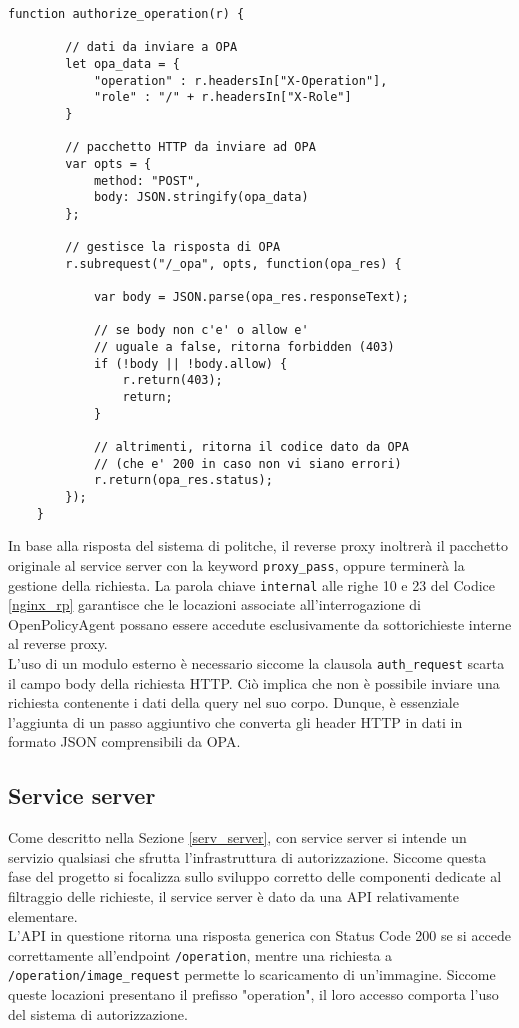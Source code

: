 \begin{lstlisting}[caption={Frammento di codice del modulo NJS},captionpos=b,label=NJS]
    function authorize_operation(r) {

        // dati da inviare a OPA
        let opa_data = {
            "operation" : r.headersIn["X-Operation"],
            "role" : "/" + r.headersIn["X-Role"]
        }
    
        // pacchetto HTTP da inviare ad OPA
        var opts = {
            method: "POST",
            body: JSON.stringify(opa_data)
        };
        
        // gestisce la risposta di OPA
        r.subrequest("/_opa", opts, function(opa_res) {
    
            var body = JSON.parse(opa_res.responseText);
            
            // se body non c'e' o allow e' 
            // uguale a false, ritorna forbidden (403)
            if (!body || !body.allow) {
                r.return(403);
                return;
            }

            // altrimenti, ritorna il codice dato da OPA 
            // (che e' 200 in caso non vi siano errori)
            r.return(opa_res.status);
        });
    }
\end{lstlisting}
In base alla risposta del sistema di politche, il reverse proxy inoltrerà il pacchetto originale al service server con la keyword \texttt{proxy\_pass}, 
oppure terminerà la gestione della richiesta.
La parola chiave \texttt{internal} alle righe 10 e 23 del Codice \ref{nginx_rp}  garantisce che le locazioni 
associate all'interrogazione di OpenPolicyAgent possano essere accedute esclusivamente da sottorichieste interne al reverse proxy. 
\\ L'uso di un modulo esterno è necessario siccome la clausola \texttt{auth\_request} scarta il campo body della 
richiesta HTTP. Ciò implica che non è possibile inviare una richiesta contenente i dati della query nel suo corpo.
Dunque, è essenziale l'aggiunta di un passo aggiuntivo che converta gli header HTTP in dati in formato
JSON comprensibili da OPA. 


\subsection{Service server}
Come descritto nella Sezione \ref*{serv_server}, con service server si intende un servizio qualsiasi che sfrutta 
l'infrastruttura di autorizzazione. 
Siccome questa fase del progetto si focalizza sullo sviluppo corretto delle componenti dedicate 
al filtraggio delle richieste, il service server è dato da una API relativamente elementare. \\
L'API in questione ritorna una risposta generica con Status Code 200 se si accede correttamente all'endpoint \texttt{/operation}, 
mentre una richiesta a \texttt{/operation/image\_request} permette lo scaricamento di 
un'immagine. Siccome queste locazioni presentano il prefisso "operation", il loro accesso comporta l'uso 
del sistema di autorizzazione.  

